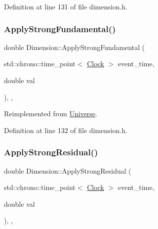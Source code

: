 Definition at line 131 of file dimension.\+h.

\mbox{\label{class_dimension_afb01fb9e469da18899d4b14e5f095ece}} 
\subsubsection{\texorpdfstring{Apply\+Strong\+Fundamental()}{ApplyStrongFundamental()}}
{\footnotesize\ttfamily double Dimension\+::\+Apply\+Strong\+Fundamental (\begin{DoxyParamCaption}\item[{std\+::chrono\+::time\+\_\+point$<$ \hyperlink{universe_8h_a0ef8d951d1ca5ab3cfaf7ab4c7a6fd80}{Clock} $>$}]{event\+\_\+time,  }\item[{double}]{val }\end{DoxyParamCaption})\hspace{0.3cm}{\ttfamily [inline]}, {\ttfamily [final]}, {\ttfamily [virtual]}}



Reimplemented from \hyperlink{class_universe_a62789bcff84bd750b0366004381e2fdd}{Universe}.



Definition at line 132 of file dimension.\+h.

\mbox{\label{class_dimension_a2ae0b6a8ee17f6e28b6d2d3209df4bf4}} 
\subsubsection{\texorpdfstring{Apply\+Strong\+Residual()}{ApplyStrongResidual()}}
{\footnotesize\ttfamily double Dimension\+::\+Apply\+Strong\+Residual (\begin{DoxyParamCaption}\item[{std\+::chrono\+::time\+\_\+point$<$ \hyperlink{universe_8h_a0ef8d951d1ca5ab3cfaf7ab4c7a6fd80}{Clock} $>$}]{event\+\_\+time,  }\item[{double}]{val }\end{DoxyParamCaption})\hspace{0.3cm}{\ttfamily [inline]}, {\ttfamily [final]}, {\ttfamily [virtual]}}



